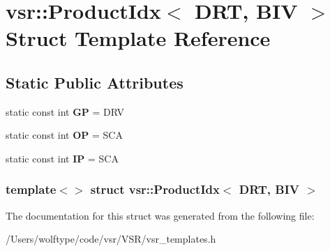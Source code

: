 \hypertarget{structvsr_1_1_product_idx_3_01_d_r_t_00_01_b_i_v_01_4}{\section{vsr\-:\-:Product\-Idx$<$ D\-R\-T, B\-I\-V $>$ Struct Template Reference}
\label{structvsr_1_1_product_idx_3_01_d_r_t_00_01_b_i_v_01_4}
}
\subsection*{Static Public Attributes}
\begin{DoxyCompactItemize}
\item 
\hypertarget{structvsr_1_1_product_idx_3_01_d_r_t_00_01_b_i_v_01_4_abd074b4c61aaeb75bd9fbbd8dab79d79}{static const int {\bfseries G\-P} = D\-R\-V}\label{structvsr_1_1_product_idx_3_01_d_r_t_00_01_b_i_v_01_4_abd074b4c61aaeb75bd9fbbd8dab79d79}

\item 
\hypertarget{structvsr_1_1_product_idx_3_01_d_r_t_00_01_b_i_v_01_4_a1b0522fa69adefd85bc48705e62b6185}{static const int {\bfseries O\-P} = S\-C\-A}\label{structvsr_1_1_product_idx_3_01_d_r_t_00_01_b_i_v_01_4_a1b0522fa69adefd85bc48705e62b6185}

\item 
\hypertarget{structvsr_1_1_product_idx_3_01_d_r_t_00_01_b_i_v_01_4_a799c9de3c637b22bbb03842b99e1ebbe}{static const int {\bfseries I\-P} = S\-C\-A}\label{structvsr_1_1_product_idx_3_01_d_r_t_00_01_b_i_v_01_4_a799c9de3c637b22bbb03842b99e1ebbe}

\end{DoxyCompactItemize}
\subsubsection*{template$<$$>$ struct vsr\-::\-Product\-Idx$<$ D\-R\-T, B\-I\-V $>$}



The documentation for this struct was generated from the following file\-:\begin{DoxyCompactItemize}
\item 
/\-Users/wolftype/code/vsr/\-V\-S\-R/vsr\-\_\-templates.\-h\end{DoxyCompactItemize}
